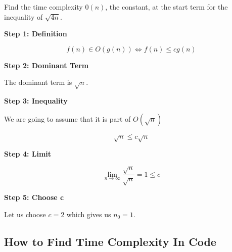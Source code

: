 Find the time complexity \(0(n)\), the constant, at the start term for the inequality of \(\sqrt{4n}\).

\textbf{Step 1: Definition}

\[
    f(n) \in O(g(n)) \iff f(n) \le c g(n)
\]

\textbf{Step 2: Dominant Term}

The dominant term is \(\sqrt{n}\).

\textbf{Step 3: Inequality}

We are going to assume that it is part of \(O(\sqrt{n})\) 

\[
    \sqrt{n} \le c \sqrt{n}
\]

\textbf{Step 4: Limit}

\[
    \lim_{n \to \infty} \frac{\sqrt{n}}{\sqrt{n}} = 1 \le c
\]

\textbf{Step 5: Choose c}

Let us choose \(c = 2\) which gives us \(n_0 = 1\).

\subsection{How to Find Time Complexity In Code}

